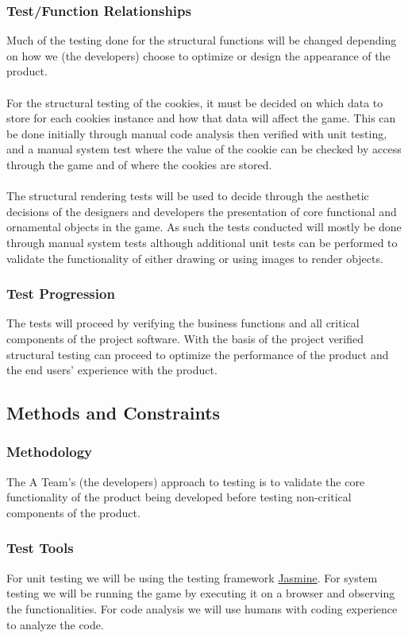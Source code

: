 \documentclass[11pt, oneside]{article}   	%
\begin{document}
\subsubsection*{Test/Function Relationships}
Much of the testing done for the structural functions will be changed depending on how we (the developers) choose to optimize or design the appearance of the product.\\
\\
For the structural testing of the cookies, it must be decided on which data to store for each cookies instance and how that data will affect the game. This can be done initially through manual code analysis then verified with unit testing, and a manual system test where the value of the cookie can be checked by access through the game and of where the cookies are stored.\\
\\
The structural rendering tests will be used to decide through the aesthetic decisions of the designers and developers the presentation of core functional and ornamental objects in the game. As such the tests conducted will mostly be done through manual system tests although additional unit tests can be performed to validate the functionality of either drawing or using images to render objects.

\subsubsection*{Test Progression}
The tests will proceed by verifying the business functions and all critical components of the project software. With the basis of the project verified structural testing can proceed to optimize the performance of the product and the end users' experience with the product.

\subsection{Methods and Constraints}
\subsubsection*{Methodology}
The A Team's (the developers) approach to testing is to validate the core functionality of the product being developed before testing non-critical components of the product.

\subsubsection*{Test Tools}
For unit testing we will be using the testing framework \href{http://jasmine.github.io/}{Jasmine}. For system testing we will be running the game by executing it on a browser and observing the functionalities. For code analysis we will use humans with coding experience to analyze the code.
\end{document}
